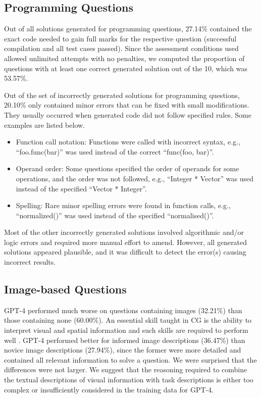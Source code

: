 \documentclass[sigconf,review]{acmart}
\begin{document}
\subsection{Programming Questions}

Out of all solutions generated for programming questions, 27.14\% contained the exact code needed to gain full marks for the respective question (successful compilation and all test cases passed). Since the assessment conditions used allowed unlimited attempts with no penalties, we computed the proportion of questions with at least one correct generated solution out of the 10, which was 53.57\%.

Out of the set of incorrectly generated solutions for programming questions, 20.10\% only contained minor errors that can be fixed with small modifications. They usually occurred when generated code did not follow specified rules. Some examples are listed below.
\begin{itemize}
    \item Function call notation: Functions were called with incorrect syntax, e.g., ``foo.func(bar)'' was used instead of the correct ``func(foo, bar)''.
    \item Operand order: Some questions specified the order of operands for some operations, and the order was not followed, e.g., ``Integer * Vector'' was used instead of the specified ``Vector * Integer''.
    \item Spelling: Rare minor spelling errors were found in function calls, e.g., ``normalized()'' was used instead of the specified ``normalised()''.
\end{itemize}

Most of the other incorrectly generated solutions involved algorithmic and/or logic errors and required more manual effort to amend. However, all generated solutions appeared plausible, and it was difficult to detect the error(s) causing incorrect results.

\subsection{Image-based Questions}

GPT-4 performed much worse on questions containing images (32.21\%) than those containing none (60.00\%). An essential skill taught in CG is the ability to interpret visual and spatial information \cite{visual} and such skills are required to perform well \cite{Liu2022}. GPT-4 performed better for informed image descriptions (36.47\%) than novice image descriptions (27.94\%), since the former were more detailed and contained all relevant information to solve a question. We were surprised that the differences were not larger. We suggest that the reasoning required to combine the textual descriptions of visual information with task descriptions is either too complex or insufficiently considered in the training data for GPT-4.
\end{document}
